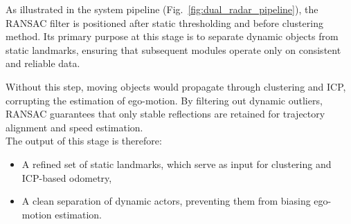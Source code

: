 \newpage
As illustrated in the system pipeline (Fig.~\ref{fig:dual_radar_pipeline}), the RANSAC filter is positioned after static thresholding and before clustering method.  
Its primary purpose at this stage is to separate dynamic objects from static landmarks, ensuring that subsequent modules operate only on consistent and reliable data.  

Without this step, moving objects would propagate through clustering and ICP, corrupting the estimation of ego-motion.  
By filtering out dynamic outliers, RANSAC guarantees that only stable reflections are retained for trajectory alignment and speed estimation.  
\vspace{0.5em}
\\
The output of this stage is therefore:
\begin{itemize}
    \item A refined set of static landmarks, which serve as input for clustering and ICP-based odometry,
    \item A clean separation of dynamic actors, preventing them from biasing ego-motion estimation.
\end{itemize}
